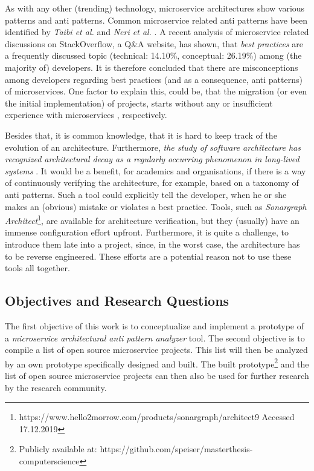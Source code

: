 \documentclass{article}
\begin{document}
As with any other (trending) technology, microservice architectures show various patterns \cite{taibi_architectural_2018} and anti patterns.
Common microservice related anti patterns have been identified by \textit{Taibi et al.} \cite{taibi_definition_2018, taibi_microservices_2020} and \textit{Neri et al.} \cite{neri_design_2019}.
A recent analysis \cite{bandeira_we_2019} of microservice related discussions on StackOverflow, a Q\&A website, has shown, that \textit{best practices} are a frequently discussed topic (technical: 14.10\%, conceptual: 26.19\%) among (the majority of) developers. It is therefore concluded that there are misconceptions among developers regarding best practices (and as a consequence, anti patterns) of microservices.
One factor to explain this, could be, that the migration (or even the initial implementation) of projects, starts without any or insufficient experience with microservices  \cite{taibi_monolithic_2019, lenarduzzi_does_2019}, respectively. \newline

Besides that, it is common knowledge, that it is hard to keep track of the evolution of an architecture. Furthermore, \textit{the study of software architecture has recognized architectural decay as a regularly occurring phenomenon in long-lived systems} \cite{le_empirical_2015}. It would be a benefit, for academics and organisations, if there is a way of continuously verifying the architecture, for example, based on a taxonomy of anti patterns.
Such a tool could explicitly tell the developer, when he or she makes an (obvious) mistake or violates a best practice.
Tools, such as \textit{Sonargraph Architect}\footnote{https://www.hello2morrow.com/products/sonargraph/architect9 Accessed 17.12.2019}, are available for architecture verification, but they (usually) have an immense configuration effort upfront.
Furthermore, it is quite a challenge, to introduce them late into a project, since, in the worst case, the architecture has to be reverse engineered.
These efforts are a potential reason not to use these tools all together.

\subsection{Objectives and Research Questions}
The first objective of this work is to conceptualize and implement a prototype of a \textit{microservice architectural anti pattern analyzer} tool. 
The second objective is to compile a list of open source microservice projects. This list will then be analyzed by an own prototype specifically designed and built. The built prototype\footnote{Publicly available at: https://github.com/speiser/masterthesis-computerscience} and the list of open source microservice projects can then also be used for further research by the research community. \newline
\end{document}
